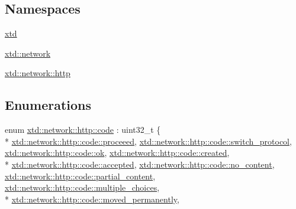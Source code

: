 \subsection*{Namespaces}
\begin{DoxyCompactItemize}
\item 
\hyperlink{namespacextd}{xtd}
\item 
\hyperlink{namespacextd_1_1network}{xtd\-::network}
\item 
\hyperlink{namespacextd_1_1network_1_1http}{xtd\-::network\-::http}
\end{DoxyCompactItemize}
\subsection*{Enumerations}
\begin{DoxyCompactItemize}
\item 
enum \hyperlink{namespacextd_1_1network_1_1http_a55148922a7d13fe756e53e2ccad4b89c}{xtd\-::network\-::http\-::code} \-: uint32\-\_\-t \{ \\*
\hyperlink{namespacextd_1_1network_1_1http_a55148922a7d13fe756e53e2ccad4b89cab41e384919d3fded84fe2803c82af70f}{xtd\-::network\-::http\-::code\-::proceeed}, 
\hyperlink{namespacextd_1_1network_1_1http_a55148922a7d13fe756e53e2ccad4b89ca95e78c491edb90cfdcd3ff95e4700d46}{xtd\-::network\-::http\-::code\-::switch\-\_\-protocol}, 
\hyperlink{namespacextd_1_1network_1_1http_a55148922a7d13fe756e53e2ccad4b89ca444bcb3a3fcf8389296c49467f27e1d6}{xtd\-::network\-::http\-::code\-::ok}, 
\hyperlink{namespacextd_1_1network_1_1http_a55148922a7d13fe756e53e2ccad4b89cae2fa538867c3830a859a5b17ab24644b}{xtd\-::network\-::http\-::code\-::created}, 
\\*
\hyperlink{namespacextd_1_1network_1_1http_a55148922a7d13fe756e53e2ccad4b89ca3e4d891a5df3d6d0d7dd9432a1bc6470}{xtd\-::network\-::http\-::code\-::accepted}, 
\hyperlink{namespacextd_1_1network_1_1http_a55148922a7d13fe756e53e2ccad4b89ca7d1e27253ac06e307e599edb2b0558bd}{xtd\-::network\-::http\-::code\-::no\-\_\-content}, 
\hyperlink{namespacextd_1_1network_1_1http_a55148922a7d13fe756e53e2ccad4b89cae5e1e80aaecf3acf426c699f9e298164}{xtd\-::network\-::http\-::code\-::partial\-\_\-content}, 
\hyperlink{namespacextd_1_1network_1_1http_a55148922a7d13fe756e53e2ccad4b89ca9aeba7eb915334acd922761566c2ac86}{xtd\-::network\-::http\-::code\-::multiple\-\_\-choices}, 
\\*
\hyperlink{namespacextd_1_1network_1_1http_a55148922a7d13fe756e53e2ccad4b89ca522c7a01a5f0022064cc90149c179fa7}{xtd\-::network\-::http\-::code\-::moved\-\_\-permanently}, 

\end{DoxyCompactItemize}
